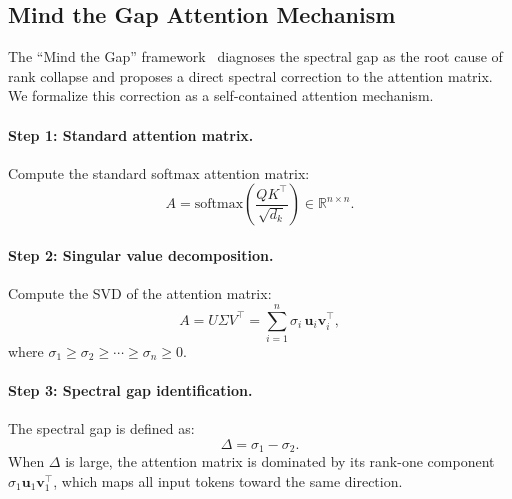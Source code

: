 \documentclass[12pt, a4paper]{article}
\begin{document}
\subsection{Mind the Gap Attention Mechanism}

The ``Mind the Gap'' framework~\cite{mind_the_gap} diagnoses the spectral
gap as the root cause of rank collapse and proposes a direct spectral
correction to the attention matrix. We formalize this correction as a
self-contained attention mechanism.

\paragraph{Step 1: Standard attention matrix.}
Compute the standard softmax attention matrix:
\begin{equation}
    A = \text{softmax}\!\left(\frac{QK^\top}{\sqrt{d_k}}\right)
    \in \mathbb{R}^{n \times n}.
    \label{eq:mtg_standard}
\end{equation}

\paragraph{Step 2: Singular value decomposition.}
Compute the SVD of the attention matrix:
\begin{equation}
    A = U \Sigma V^\top = \sum_{i=1}^{n} \sigma_i\, \mathbf{u}_i \mathbf{v}_i^\top,
    \label{eq:mtg_svd}
\end{equation}
where $\sigma_1 \geq \sigma_2 \geq \cdots \geq \sigma_n \geq 0$.

\paragraph{Step 3: Spectral gap identification.}
The spectral gap is defined as:
\begin{equation}
    \Delta = \sigma_1 - \sigma_2.
    \label{eq:spectral_gap}
\end{equation}
When $\Delta$ is large, the attention matrix is dominated by its
rank-one component $\sigma_1 \mathbf{u}_1 \mathbf{v}_1^\top$, which
maps all input tokens toward the same direction.
\end{document}
